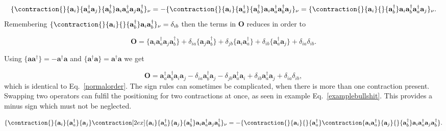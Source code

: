 \documentclass[graybox,sectrefs,envcountresetchap,open=right]{svmonodo}
\begin{document}
\begin{equation}
\{
\contraction{}{\mathbf{a}_i}{\mathbf{a}^{\dagger}_a \mathbf{a}_j}{\mathbf{a}^{\dagger}_b}
\mathbf{a}_i \mathbf{a}^{\dagger}_a \mathbf{a}_j \mathbf{a}^{\dagger}_b
\}_{\nu}
= - \{
\contraction{}{\mathbf{a}_i}{\mathbf{a}^{\dagger}_a}{\mathbf{a}^{\dagger}_b}
\mathbf{a}_i \mathbf{a}^{\dagger}_a \mathbf{a}^{\dagger}_b 
\mathbf{a}_j 
\}_{\nu}
= \{
\contraction{}{\mathbf{a}_i}{}{\mathbf{a}^{\dagger}_b}
\mathbf{a}_i  \mathbf{a}^{\dagger}_b 
\mathbf{a}^{\dagger}_a \mathbf{a}_j 
\}_{\nu} . \label{wikssign}
\end{equation} 
Remembering $\{\contraction{}{\mathbf{a}_i}{}{\mathbf{a}^{\dagger}_b}
\mathbf{a}_i  \mathbf{a}^{\dagger}_b \}_{\nu} = \delta_{ib}$ then the terms in $\mathbf{O}$ reduces in order to

\begin{equation}
\mathbf{O} =  \{ 
\mathbf{a}_i \mathbf{a}^{\dagger}_a
\mathbf{a}_j \mathbf{a}^{\dagger}_b
\} +
\delta_{ia} \{
\mathbf{a}_j \mathbf{a}^{\dagger}_b
\} +
\delta_{jb} \{
\mathbf{a}_i \mathbf{a}^{\dagger}_a
\} +
\delta_{ib} \{
\mathbf{a}^{\dagger}_a \mathbf{a}_j
\} +
\delta_{ia} \delta_{ib} . 
\end{equation} 

Using $\{\mathbf{a} \mathbf{a}^{\dagger}
\} = -\mathbf{a}^{\dagger} \mathbf{a}$ and $\{
\mathbf{a}^{\dagger} \mathbf{a} 
\} = \mathbf{a}^{\dagger} \mathbf{a}$ we get

\begin{equation}
\mathbf{O} = 
\mathbf{a}^{\dagger}_a \mathbf{a}^{\dagger}_b
\mathbf{a}_i \mathbf{a}_j  
- \delta_{ia} \mathbf{a}^{\dagger}_b \mathbf{a}_j
- \delta_{jb} \mathbf{a}^{\dagger}_a \mathbf{a}_i
+ \delta_{ib} \mathbf{a}^{\dagger}_a \mathbf{a}_j 
+ \delta_{ia} \delta_{ib} ,
\end{equation} 
which is identical to Eq.~\ref{normalorder}. The sign rules can sometimes be complicated, when there is more than one contraction present. Swapping two operators can fulfil the positioning for two contractions at once, as seen in example Eq.~\ref{examplebullshit}. This provides a minus sign which must not be neglected.

\begin{equation}
\{
\contraction{}{\mathbf{a}_i}{\mathbf{a}^{\dagger}_a}{\mathbf{a}_j}
\contraction[2ex]{\mathbf{a}_i}{\mathbf{a}^{\dagger}_a}{\mathbf{a}_j}{\mathbf{a}^{\dagger}_b}
\mathbf{a}_i \mathbf{a}^{\dagger}_a \mathbf{a}_j \mathbf{a}^{\dagger}_b
\}_{\nu}
= - \{
\contraction{}{\mathbf{a}_i}{}{\mathbf{a}^{\dagger}_a}
\contraction{\mathbf{a}_i \mathbf{a}^{\dagger}_a}{\mathbf{a}_j}{}{\mathbf{a}^{\dagger}_b}
\mathbf{a}_i \mathbf{a}^{\dagger}_a \mathbf{a}_j \mathbf{a}^{\dagger}_b
\} . \label{examplebullshit}
\end{equation} 
\end{document}
